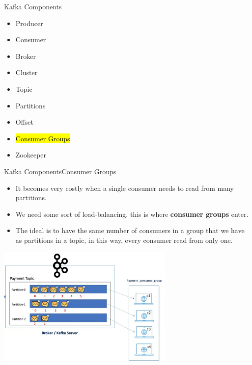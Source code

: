 \documentclass{beamer}
\begin{document}
\begin{frame}{Kafka Components}
  \begin{itemize}
    \item Producer
    \item Consumer
    \item Broker
    \item Cluster
    \item Topic
    \item Partitions
    \item Offset
    \item \hl{Consumer Groups}
    \item Zookeeper
  \end{itemize}
\end{frame}

\begin{frame}{Kafka Components}{Consumer Groups}
  \begin{itemize}
    \item It becomes very costly when a single consumer needs to read from many partitions.
    \item We need some sort of load-balancing, this is where \textbf{consumer groups} enter.
    \item The ideal is to have the same number of consumers in a group that we have as partitions in a topic, in this way, every consumer read from only one.
  \end{itemize}
  \hspace*{4.5em}
  \includegraphics[width=0.65\textwidth]{fig/consumer_group.png}
\end{frame}
\end{document}
